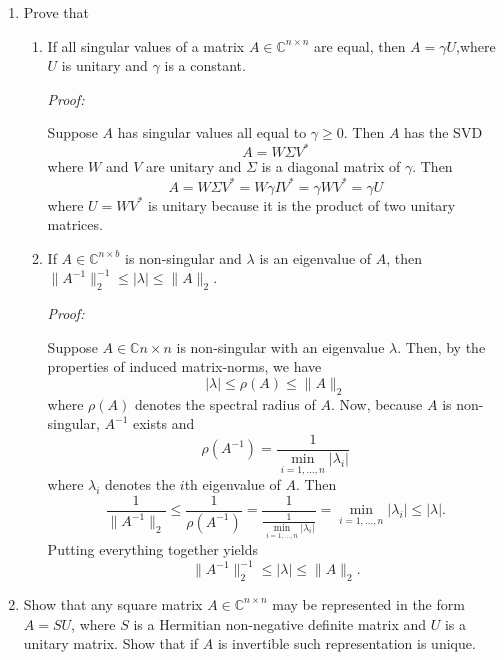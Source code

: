 \documentclass[a4paper,12pt]{article}
\newcommand{\comps}{\mathbb{C}}
\newcommand{\abs}[1]{\left| #1 \right|}
\newcommand{\norm}[1]{\lVert #1 \rVert}
\newenvironment{proof}[2][$\square$]
    {\setlength{\parskip}{0pt}\par\textit{Proof:} #2\setlength{\parskip}{0.25cm}
        \savebox{\qed}{#1}
        \begin{adjustwidth}{\widthof{Proof:}}{}
    }
    {
        \hfill\usebox{\qed}\end{adjustwidth}
    }
\begin{document}
\begin{enumerate}[label = (\arabic*)]
	\item Prove that
	\begin{enumerate}[label = (\alph*)]
		\item If all singular values of a matrix $ A \in \comps^{n \times n} $ are equal, then $ A = \gamma U $,where $ U $ is unitary and $ \gamma $ is a constant.
		
		\begin{proof}{}
			Suppose $ A $ has singular values all equal to $ \gamma \geq 0 $. Then $ A $ has the SVD
			\[
				A = W \Sigma V^*
			\]
			where $ W $ and $ V $ are unitary and $ \Sigma $ is a diagonal matrix of $ \gamma $. Then
			\[
				A = W \Sigma V^* 
				    = W \gamma I V^* 
				    = \gamma W V^* 
				    = \gamma U
			\]
			where $ U = W V^* $ is unitary because it is the product of two unitary matrices.
		\end{proof}
	
		\item If $ A \in \comps^{n \times b} $ is non-singular and $ \lambda $ is an eigenvalue of $ A $, then $ \norm{A^{-1}}^{-1}_2 \leq \abs{\lambda} \leq \norm{A}_2 $.
		
		\begin{proof}{}
			Suppose $ A \in \comps{n \times n} $ is non-singular with an eigenvalue $ \lambda $. Then, by the properties of induced matrix-norms, we have
			\[
				\abs{\lambda} \leq \rho(A) \leq \norm{A}_2
			\]
			where $ \rho(A) $ denotes the spectral radius of $ A $. Now, because $ A $ is non-singular, $ A^{-1} $ exists and 
			\[
				\rho(A^{-1}) = \frac{1}{\min\limits_{i = 1, \ldots, n} \abs{\lambda_i}}
			\]
			where $ \lambda_i $ denotes the $ i $th eigenvalue of $ A $. Then
			\[
				\frac{1}{\norm{A^{-1}}_2} \leq \frac{1}{\rho(A^{-1})} 
				= \frac{1}{\frac{1}{\min\limits_{i = 1, \ldots, n} \abs{\lambda_i}}} 
				= \min\limits_{i = 1, \ldots, n} \abs{\lambda_i} 
				\leq \abs{\lambda}.
			\]
			Putting everything together yields
			\[
				\norm{A^{-1}}^{-1}_2 \leq \abs{\lambda} \leq \norm{A}_2.
			\]
		\end{proof}
	\end{enumerate}


	\newpage
	\item Show that any square matrix $ A \in \comps^{n \times n} $ may be represented in the form $ A = SU $, where $ S $ is a Hermitian non-negative definite matrix and $ U $ is a unitary matrix. Show that if $ A $ is invertible such representation is unique.
	

\end{enumerate}
\end{document}
